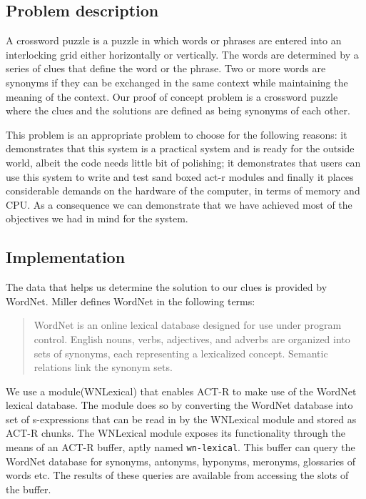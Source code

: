 \subsection{Problem description}

A crossword puzzle is a puzzle in which words or phrases are entered
into an interlocking grid either horizontally or vertically. The words
are determined by a series of clues that define the word or the
phrase. Two or more words are synonyms if they can be exchanged in the
same context while maintaining the meaning of the context. Our proof
of concept problem is a crossword puzzle where the clues and the
solutions are defined as being synonyms of each other.


This problem is an appropriate problem to choose for the following
reasons: it demonstrates that this system is a practical system and is
ready for the outside world, albeit the code needs little bit of
polishing; it demonstrates that users can use this system to write and
test sand boxed act-r modules and finally it places considerable
demands on the hardware of the computer, in terms of memory and
CPU. As a consequence we can demonstrate that we have achieved most of
the objectives we had in mind for the system.

\subsection{Implementation}

The data that helps us determine the solution to our clues is provided
by WordNet\cite{journals/cacm/Miller95}. Miller defines WordNet in the
following terms:

\begin{quote}
  WordNet is an online lexical database designed for use under
  program control. English nouns, verbs, adjectives, and adverbs are
  organized into sets of synonyms, each representing a lexicalized
  concept. Semantic relations link the synonym sets. 
\end{quote}

We use a module(WNLexical\cite{emond2006wn}) that enables ACT-R to make use of the
WordNet lexical database. The module does so by converting the WordNet
database into set of s-expressions that can be read in by the
WNLexical module and stored as ACT-R chunks. The WNLexical module
exposes its functionality through the means of an ACT-R buffer, aptly
named \texttt{wn-lexical}. This buffer can query the WordNet database
for synonyms, antonyms, hyponyms, meronyms, glossaries of words
etc. The results of these queries are available from accessing the
slots of the buffer.


